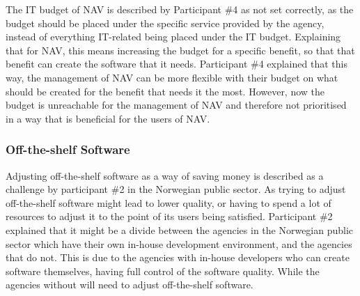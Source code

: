 
The IT budget of NAV is described by Participant \#4 as not set correctly, as the budget should be placed under the specific service provided by the agency, instead of everything IT-related being placed under the IT budget. Explaining that for NAV, this means increasing the budget for a specific benefit, so that that benefit can create the software that it needs. Participant \#4 explained that this way, the management of NAV can be more flexible with their budget on what should be created for the benefit that needs it the most. However, now the budget is unreachable for the management of NAV and therefore not prioritised in a way that is beneficial for the users of NAV.


\subsubsection{Off-the-shelf Software} \label{sec:off_the_shelf_software}
Adjusting off-the-shelf software as a way of saving money is described as a challenge by participant \#2 in the Norwegian public sector. As trying to adjust off-the-shelf software might lead to lower quality, or having to spend a lot of resources to adjust it to the point of its users being satisfied. Participant \#2 explained that it might be a divide between the agencies in the Norwegian public sector which have their own in-house development environment, and the agencies that do not. This is due to the agencies with in-house developers who can create software themselves, having full control of the software quality. While the agencies without will need to adjust off-the-shelf software.

